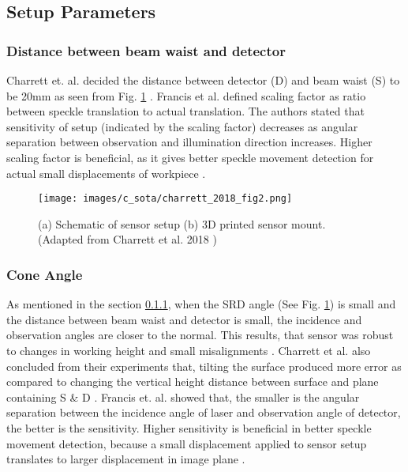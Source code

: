 \subsection{Setup Parameters}

    \subsubsection{Distance between beam waist and detector}\label{Subsubsection:Distance_Beam_Waist_Detector}
    Charrett et. al. decided the distance between detector (D) and beam waist (S) to be 20mm as seen from Fig. \ref{fig:charrett_2018_fig2} \cite{charrett_2018}. Francis et al. \cite{francis_autonomous} defined scaling factor as ratio between speckle translation to actual translation. The authors stated that sensitivity of setup (indicated by the scaling factor) decreases as angular separation between observation and illumination direction increases. Higher scaling factor is beneficial, as it gives better speckle movement detection for actual small displacements of workpiece \cite{francis_autonomous}.

    \begin{figure}[h]
        \centering
        \texttt{[image: images/c\_sota/charrett\_2018\_fig2.png]}
        \caption{(a) Schematic of sensor setup (b) 3D printed sensor mount. (Adapted from Charrett et al. 2018 \cite{charrett_2018})}
        \label{fig:charrett_2018_fig2}
    \end{figure}


    \subsubsection{Cone Angle}
    As mentioned in the section \ref{Subsubsection:Distance_Beam_Waist_Detector}, when the SRD angle (See Fig. \ref{fig:charrett_2018_fig2}) is small and the distance between beam waist and detector is small, the incidence and observation angles are closer to the normal. This results, that sensor was robust to changes in working height and small misalignments \cite{charrett_2018}. Charrett et al. also concluded from their experiments that, tilting the surface produced more error as compared to changing the vertical height distance between surface and plane containing S \& D \cite{charrett_2018}. Francis et. al. showed that, the smaller is the angular separation between the incidence angle of laser and observation angle of detector, the better is the sensitivity. Higher sensitivity is beneficial in better speckle movement detection, because a small displacement applied to sensor setup translates to larger displacement in image plane \cite{francis_autonomous}.
    
